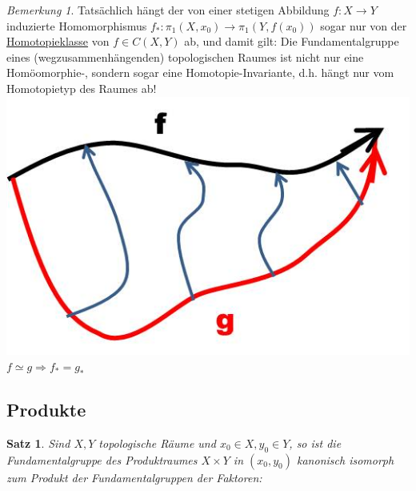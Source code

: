 \documentclass[a4paper,11pt,notitlepage]{report}
\newtheorem{theorem}{Satz}[chapter]
\theoremstyle{remark}
\newtheorem{remark}{Bemerkung}[chapter]
\theoremstyle{definition}
\begin{document}
\begin{remark}
	Tatsächlich hängt der von einer stetigen Abbildung $f \colon X \rightarrow Y$ induzierte Homomorphismus $f_* \colon \pi_1(X,x_0) \rightarrow \pi_1(Y,f(x_0))$ sogar nur von der \underline{Homotopieklasse} von $f \in C(X,Y)$ ab, und damit gilt:
	\newline
	Die Fundamentalgruppe eines (wegzusammenhängenden) topologischen Raumes ist nicht nur eine Homöomorphie-, sondern sogar eine Homotopie-Invariante, d.h. hängt nur vom Homotopietyp des Raumes ab! \newline
	\includegraphics[scale=0.4]{images/f_g_homotop.jpg}
	\newline
	$f \simeq g \Rightarrow f_* = g_*$
\end{remark}

\newpage
\subsection{Produkte}
\begin{theorem}
	Sind $X,Y$ topologische Räume und $x_0 \in X, y_0 \in Y$, so ist die Fundamentalgruppe des Produktraumes $X \times Y$ in $(x_0,y_0)$ kanonisch isomorph zum Produkt der Fundamentalgruppen der Faktoren:
	\begin{center}
	\end{center}
\end{theorem}
\end{document}
